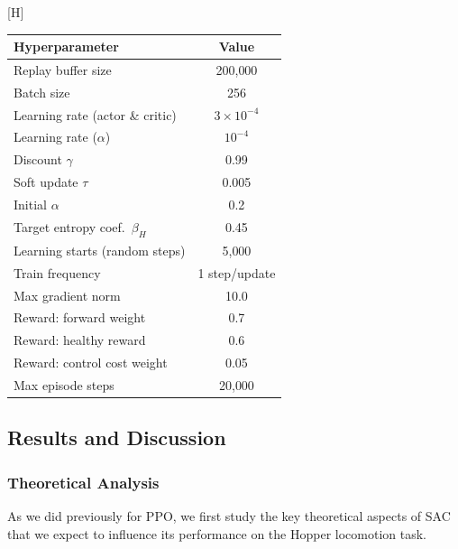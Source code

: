 \documentclass[onecolumn]{cwpreport} %
\makeatletter
\renewenvironment{table}[1][htbp]{%
  \@float{table}[#1]%
}{%
  \end@float
}
\makeatother
\begin{document}
\begin{table}[H]
    \centering
    \caption{SAC hyperparameters for Hopper-v5 with pixel observations.}
    \label{tab:sac_hp}
    \begin{tabular}{lc}
        \toprule
        \textbf{Hyperparameter}         & \textbf{Value}     \\
        \midrule
        Replay buffer size              & 200{,}000          \\
        Batch size                      & 256                \\
        Learning rate (actor \& critic) & $3 \times 10^{-4}$ \\
        Learning rate ($\alpha$)        & $10^{-4}$          \\
        Discount $\gamma$               & 0.99               \\
        Soft update $\tau$              & 0.005              \\
        Initial $\alpha$                & 0.2                \\
        Target entropy coef.\ $\beta_H$ & 0.45               \\
        Learning starts (random steps)  & 5{,}000            \\
        Train frequency                 & 1 step/update      \\
        Max gradient norm               & 10.0               \\
        Reward: forward weight          & 0.7                \\
        Reward: healthy reward          & 0.6                \\
        Reward: control cost weight     & 0.05               \\
        Max episode steps               & 20{,}000           \\
        \bottomrule
    \end{tabular}
\end{table}


\subsection{Results and Discussion}

\subsubsection{Theoretical Analysis}

As we did previously for PPO, we first study the key theoretical aspects of SAC that we expect to influence its performance on the Hopper locomotion task.
\end{document}
